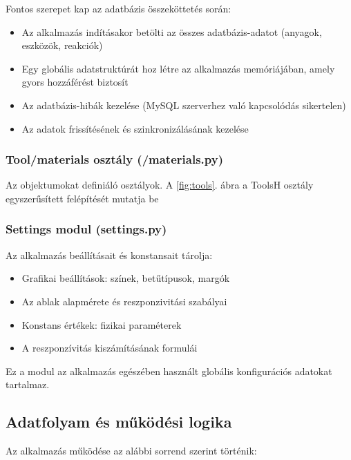\documentclass[]{thesis-ekf}
\begin{document}
	Fontos szerepet kap az adatbázis összeköttetés során:
	\begin{itemize}
		\item Az alkalmazás indításakor betölti az összes adatbázis-adatot (anyagok, eszközök, reakciók)
		\item Egy globális adatstruktúrát hoz létre az alkalmazás memóriájában, amely gyors hozzáférést biztosít
		\item Az adatbázis-hibák kezelése (MySQL szerverhez való kapcsolódás sikertelen)
		\item Az adatok frissítésének és szinkronizálásának kezelése
	\end{itemize}
	
	\subsubsection{Tool/materials osztály (/materials.py)}
	
	Az objektumokat definiáló osztályok. A \ref{fig:tools}. ábra a ToolsH osztály egyszerűsített felépítését mutatja be
	
	
	
	\subsubsection{Settings modul (settings.py)}
	
	Az alkalmazás beállításait és konstansait tárolja:
	\begin{itemize}
		\item Grafikai beállítások: színek, betűtípusok, margók
		\item Az ablak alapmérete és reszponzivitási szabályai
		\item Konstans értékek: fizikai paraméterek 
		\item A reszponzívitás kiszámításának formulái
	\end{itemize}
	Ez a modul az alkalmazás egészében használt globális konfigurációs adatokat tartalmaz.
	
	\subsection{Adatfolyam és működési logika}
	
	Az alkalmazás működése az alábbi sorrend szerint történik:
	
\end{document}
